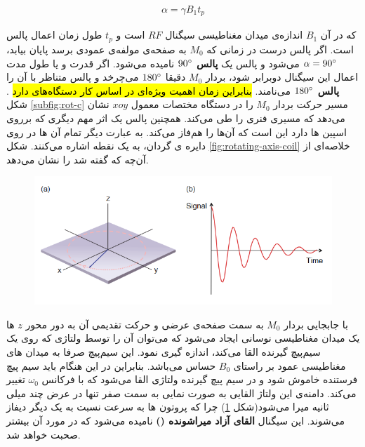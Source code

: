 \removevspace
\begin{align}
	\alpha = \gamma B_1 t_p
\end{align}




که در آن $B_1$ اندازه‌ی میدان مغناطیسی سیگنال $RF$ است و $t_p$ طول زمان اعمال پالس است. اگر پالس  درست در زمانی که $M_0$ به صفحه‌ی مولفه‌‌ی عمودی برسد پایان بیابد، $\alpha=90\degree$ می‌شود و پالس  یک \textbf{پالس $90\degree$} نامیده می‌شود. اگر قدرت و یا طول مدت اعمال این سیگنال دوبرابر شود، بردار $M_0$ دقیقا $180\degree$ می‌چرخد و پالس متناظر با آن را \textbf{پالس $180\degree$} می‌نامند. 
\hl{بنابراین زمان اهمیت ویژه‌ای در اساس کار دستگاه‌های \mri دارد}
\cite{McRobbie}.
شکل \ref{subfig:rot-c}
مسیر حرکت بردار $M_0$ را در دستگاه مختصات معمول $xoy$ نشان می‌دهد که مسیری فنری را طی می‌کند.
همچنین پالس  یک اثر مهم دیگری که بر‌روی اسپین ها دارد این است که آن‌ها را هم‌فاز می‌کند. به عبارت‌ دیگر تمام آن ها در روی دایره ی گردان، به یک نقطه اشاره می‌کنند. شکل \ref{fig:rotating-axis-coil} خلاصه‌ای از آن‌چه که گفته شد را نشان می‌دهد.



 
 
 \begin{figure}
 	\centering
 	\includegraphics[width=0.8\linewidth]{chapters/chapter-2/figs/signal-recived}
 	\caption{}
 	\label{fig:signal-recived}
 \end{figure}
 
 
 
 با جابجایی بردار $M_0$ به سمت صفحه‌ی عرضی و حرکت تقدیمی آن به دور محور $z$ ها یک میدان مغناطیسی نوسانی ایجاد می‌شود که می‌توان آن را توسط ولتاژی که روی یک سیم‌پیچ گیرنده القا می‌کند، اندازه گیری نمود. 
 این سیم‌پیچ صرفا به میدان های مغناطیسی عمود بر راستای $B_0$ حساس می‌باشد. بنابراین در این هنگام باید سیم پیچ فرستنده خاموش شود و در سیم پیچ گیرنده ولتاژی القا می‌شود که با فرکانس $\omega_0$ تغییر می‌کند. دامنه‌ی این ولتاژ القایی به صورت نمایی به سمت صفر تنها در عرض چند میلی ثانیه میرا می‌شود(شکل \ref{fig:signal-recived})
چرا که پروتون ها به سرعت نسبت به یک دیگر دیفاز 
می‌شوند. این سیگنال \textbf{القای آزاد میرا‌شونده ()}
نامیده می‌شود\cite{JosephHornak}
 که در مورد آن بیشتر صحبت خواهد شد.

